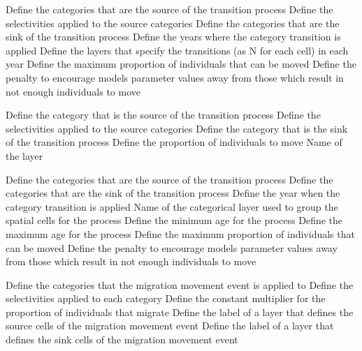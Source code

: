  {Define the categories that are the source of the transition process}
 {Define the selectivities applied to the source categories}
 {Define the categories that are the sink of the transition process}
 {Define the years where the category transition is applied}
 {Define the layers that specify the transitions (as N for each cell) in each year}
 {Define the maximum proportion of individuals that can be moved}
 {Define the penalty to encourage models parameter values away from those which result in not enough individuals to move}
\par\textbf{}\par
{} {Define the category that is the source of the transition process}
 {Define the selectivities applied to the source categories}
 {Define the category that is the sink of the transition process}
 {Define the proportion of individuals to move}
 {Name of the layer}
\par\textbf{}\par
{} {Define the categories that are the source of the transition process}
 {Define the categories that are the sink of the transition process}
 {Define the year when the category transition is applied}
 {Name of the categorical layer used to group the spatial cells for the process}
 {Define the minimum age for the process }
 {Define the maximum age for the process}
 {Define the maximum proportion of individuals that can be moved}
 {Define the penalty to encourage models parameter values away from those which result in not enough individuals to move}
\par\textbf{}\par
{} {Define the categories that the migration movement event is applied to}
 {Define the selectivities applied to each category}
 {Define the constant multiplier for the proportion of individuals that migrate}
 {Define the label of a layer that defines the source cells of the migration movement event}
 {Define the label of a layer that defines the sink cells of the migration movement event}
